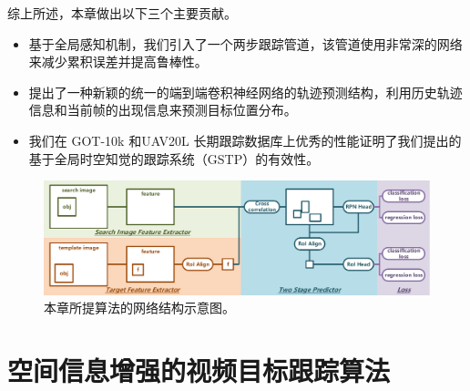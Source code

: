 综上所述，本章做出以下三个主要贡献。
\begin{itemize}
\item 基于全局感知机制，我们引入了一个两步跟踪管道，该管道使用非常深的网络来减少累积误差并提高鲁棒性。
\item 提出了一种新颖的统一的端到端卷积神经网络的轨迹预测结构，利用历史轨迹信息和当前帧的出现信息来预测目标位置分布。
\item 我们在 GOT-10k \cite{GOT-10k} 和UAV20L \cite{mueller2016benchmark} 长期跟踪数据库上优秀的性能证明了我们提出的基于全局时空知觉的跟踪系统（GSTP）的有效性。
\end{itemize}

\begin{figure}[t]
    \centering
    \includegraphics[width=1.0\textwidth]{Img/globally/SiamRCNN.pdf}
    \caption{本章所提算法的网络结构示意图。}
    \label{fig:siamrcnn}
\end{figure}

\section{空间信息增强的视频目标跟踪算法}

